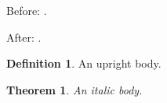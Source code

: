 \documentclass{article}
\theoremstyle{definition}
\newtheorem{definition}{Definition}
\theoremstyle{plain}
\newtheorem{theorem}{Theorem}
\begin{document}
Before: \before.

After: \after.
\begin{definition}An upright body.\end{definition}
\begin{theorem}An italic body.\end{theorem}
\end{document}
